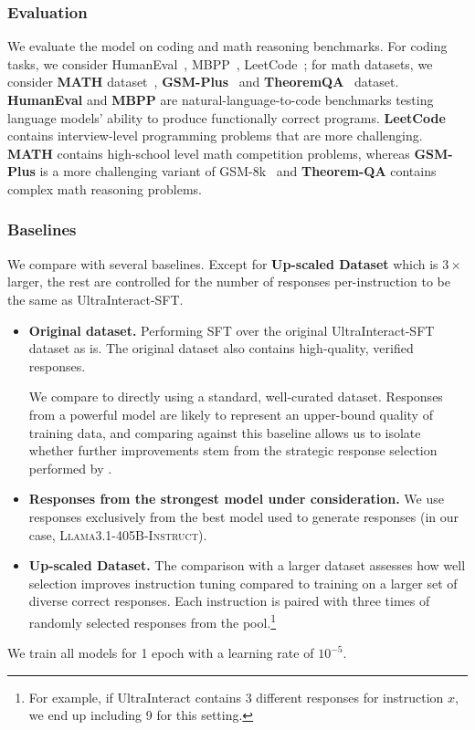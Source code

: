 \subsubsection{Evaluation}

We evaluate the model on coding and math reasoning benchmarks. For coding tasks, we consider HumanEval~\cite{chen2021humaneval}, MBPP~\cite{austin2021mbpp}, LeetCode~\cite{guo2024deepseekcoder}; for math datasets, we consider \textbf{MATH} dataset~\cite{hendrycks2021measuringmathematicalproblemsolving}, \textbf{GSM-Plus}~\cite{li2024gsmplus} and \textbf{TheoremQA}~\cite{chen2023theoremqatheoremdrivenquestionanswering} dataset. 
\textbf{HumanEval} and \textbf{MBPP} are natural-language-to-code benchmarks testing language models' ability to produce functionally correct programs. \textbf{LeetCode} contains interview-level programming problems that are more challenging. 
\textbf{MATH} contains high-school level math competition problems, whereas \textbf{GSM-Plus} is a more challenging variant of GSM-8k~\cite{cobbe2021trainingverifierssolvemath} 
and \textbf{Theorem-QA} contains complex math reasoning problems. 
\subsubsection{Baselines}
We compare \name{} with several baselines. Except for \textbf{Up-scaled Dataset} which is $3\times$ larger, the rest are controlled for the number of responses per-instruction to be the same as UltraInteract-SFT.
\begin{itemize}
\item \textbf{Original dataset.} Performing SFT over the original UltraInteract-SFT dataset as is. The original dataset also contains high-quality, verified responses.

We compare \name to directly using a standard, well-curated dataset. Responses from a powerful model are likely to represent an upper-bound quality of training data, and comparing against this baseline allows us to isolate whether further improvements stem from the strategic response selection performed by \name{}.
\item \textbf{Responses from the strongest model under consideration.} 
We use responses exclusively from the best model used to generate responses (in our case, \textsc{Llama3.1-405B-Instruct}). 

\item \textbf{Up-scaled Dataset.} The comparison with a larger dataset assesses how well selection improves instruction tuning compared to training on a larger set of diverse correct responses. Each instruction is paired with three times of randomly selected responses from the pool.\footnote{For example, if UltraInteract contains 3 different responses for instruction $x$, we end up including 9 for this setting.}
\end{itemize}
We train all models for 1 epoch with a learning rate of $10^{-5}$.

